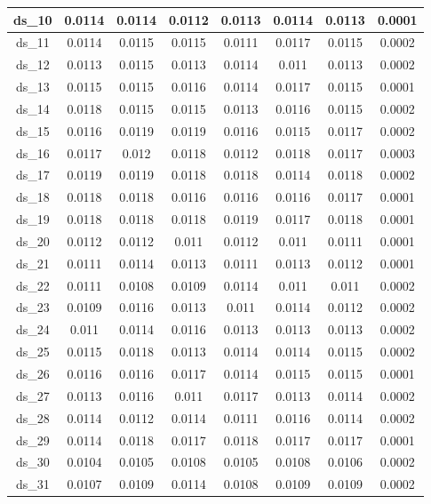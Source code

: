\begin{longtable}{|c|c|c|c|c|c|c|c|}
ds\_10	& 0.0114	& 0.0114	& 0.0112	& 0.0113	& 0.0114	& 0.0113	& 0.0001	\\ \hline
ds\_11	& 0.0114	& 0.0115	& 0.0115	& 0.0111	& 0.0117	& 0.0115	& 0.0002	\\ \hline
ds\_12	& 0.0113	& 0.0115	& 0.0113	& 0.0114	& 0.011	& 0.0113	& 0.0002	\\ \hline
ds\_13	& 0.0115	& 0.0115	& 0.0116	& 0.0114	& 0.0117	& 0.0115	& 0.0001	\\ \hline
ds\_14	& 0.0118	& 0.0115	& 0.0115	& 0.0113	& 0.0116	& 0.0115	& 0.0002	\\ \hline
ds\_15	& 0.0116	& 0.0119	& 0.0119	& 0.0116	& 0.0115	& 0.0117	& 0.0002	\\ \hline
ds\_16	& 0.0117	& 0.012	& 0.0118	& 0.0112	& 0.0118	& 0.0117	& 0.0003	\\ \hline
ds\_17	& 0.0119	& 0.0119	& 0.0118	& 0.0118	& 0.0114	& 0.0118	& 0.0002	\\ \hline
ds\_18	& 0.0118	& 0.0118	& 0.0116	& 0.0116	& 0.0116	& 0.0117	& 0.0001	\\ \hline
ds\_19	& 0.0118	& 0.0118	& 0.0118	& 0.0119	& 0.0117	& 0.0118	& 0.0001	\\ \hline
ds\_20	& 0.0112	& 0.0112	& 0.011	& 0.0112	& 0.011	& 0.0111	& 0.0001	\\ \hline
ds\_21	& 0.0111	& 0.0114	& 0.0113	& 0.0111	& 0.0113	& 0.0112	& 0.0001	\\ \hline
ds\_22	& 0.0111	& 0.0108	& 0.0109	& 0.0114	& 0.011	& 0.011	& 0.0002	\\ \hline
ds\_23	& 0.0109	& 0.0116	& 0.0113	& 0.011	& 0.0114	& 0.0112	& 0.0002	\\ \hline
ds\_24	& 0.011	& 0.0114	& 0.0116	& 0.0113	& 0.0113	& 0.0113	& 0.0002	\\ \hline
ds\_25	& 0.0115	& 0.0118	& 0.0113	& 0.0114	& 0.0114	& 0.0115	& 0.0002	\\ \hline
ds\_26	& 0.0116	& 0.0116	& 0.0117	& 0.0114	& 0.0115	& 0.0115	& 0.0001	\\ \hline
ds\_27	& 0.0113	& 0.0116	& 0.011	& 0.0117	& 0.0113	& 0.0114	& 0.0002	\\ \hline
ds\_28	& 0.0114	& 0.0112	& 0.0114	& 0.0111	& 0.0116	& 0.0114	& 0.0002	\\ \hline
ds\_29	& 0.0114	& 0.0118	& 0.0117	& 0.0118	& 0.0117	& 0.0117	& 0.0001	\\ \hline
ds\_30	& 0.0104	& 0.0105	& 0.0108	& 0.0105	& 0.0108	& 0.0106	& 0.0002	\\ \hline
ds\_31	& 0.0107	& 0.0109	& 0.0114	& 0.0108	& 0.0109	& 0.0109	& 0.0002	\\ \hline

\end{longtable}
